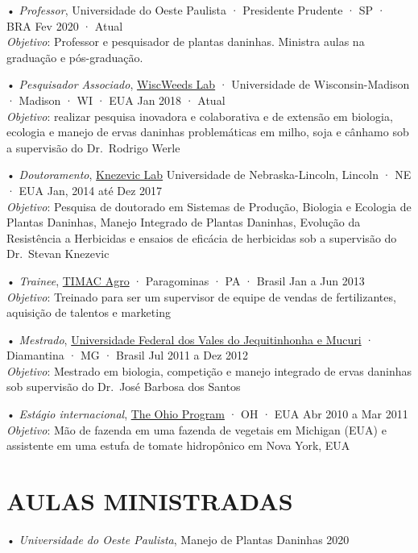 \documentclass[11pt,]{article}
\begin{document}
• \emph{Professor}, Universidade do Oeste Paulista · Presidente Prudente
· SP · BRA \hfil Fev 2020 · Atual\\
\emph{Objetivo}: Professor e pesquisador de plantas daninhas. Ministra
aulas na graduação e pós-graduação.

• \emph{Pesquisador Associado},
\href{http://www.wiscweeds.info/}{WiscWeeds Lab} · Universidade de
Wisconsin-Madison · Madison · WI · EUA \hfil Jan 2018 · Atual\\
\emph{Objetivo}: realizar pesquisa inovadora e colaborativa e de
extensão em biologia, ecologia e manejo de ervas daninhas problemáticas
em milho, soja e cânhamo sob a supervisão do Dr.~Rodrigo Werle

• \emph{Doutoramento}, \href{https://agronomy.unl.edu/knezevic}{Knezevic
Lab} Universidade de Nebraska-Lincoln, Lincoln · NE · EUA \hfil Jan,
2014 até Dez 2017\\
\emph{Objetivo}: Pesquisa de doutorado em Sistemas de Produção, Biologia
e Ecologia de Plantas Daninhas, Manejo Integrado de Plantas Daninhas,
Evolução da Resistência a Herbicidas e ensaios de eficácia de herbicidas
sob a supervisão do Dr.~Stevan Knezevic

• \emph{Trainee}, \href{http://www.timacagro.com.br/}{TIMAC Agro} ·
Paragominas · PA · Brasil \hfill Jan a Jun 2013\\
\emph{Objetivo}: Treinado para ser um supervisor de equipe de vendas de
fertilizantes, aquisição de talentos e marketing

• \emph{Mestrado}, \href{http://www.ufvjm.edu.br/}{Universidade Federal
dos Vales do Jequitinhonha e Mucuri} · Diamantina · MG · Brasil
\hfill Jul 2011 a Dez 2012\\
\emph{Objetivo}: Mestrado em biologia, competição e manejo integrado de
ervas daninhas sob supervisão do Dr.~José Barbosa dos Santos

• \emph{Estágio internacional}, \href{https://top.osu.edu/}{The Ohio
Program} · OH · EUA \hfill Abr 2010 a Mar 2011\\
\emph{Objetivo}: Mão de fazenda em uma fazenda de vegetais em Michigan
(EUA) e assistente em uma estufa de tomate hidropônico em Nova York, EUA

\hypertarget{aulas-ministradas}{%
\section{AULAS MINISTRADAS}\label{aulas-ministradas}}

• \emph{Universidade do Oeste Paulista}, Manejo de Plantas Daninhas
\hfill  2020
\end{document}
